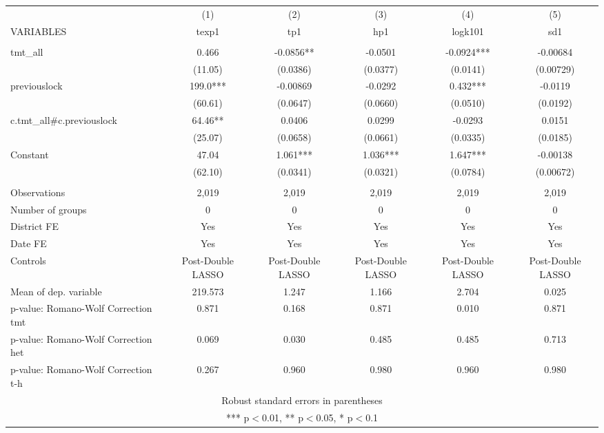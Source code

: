 \documentclass[]{article}
\begin{document}
\begin{tabular}{lccccc} \hline
 & (1) & (2) & (3) & (4) & (5) \\
VARIABLES & texp1 & tp1 & hp1 & logk101 & sd1 \\ \hline
 &  &  &  &  &  \\
tmt\_all & 0.466 & -0.0856** & -0.0501 & -0.0924*** & -0.00684 \\
 & (11.05) & (0.0386) & (0.0377) & (0.0141) & (0.00729) \\
previouslock & 199.0*** & -0.00869 & -0.0292 & 0.432*** & -0.0119 \\
 & (60.61) & (0.0647) & (0.0660) & (0.0510) & (0.0192) \\
c.tmt\_all\#c.previouslock & 64.46** & 0.0406 & 0.0299 & -0.0293 & 0.0151 \\
 & (25.07) & (0.0658) & (0.0661) & (0.0335) & (0.0185) \\
Constant & 47.04 & 1.061*** & 1.036*** & 1.647*** & -0.00138 \\
 & (62.10) & (0.0341) & (0.0321) & (0.0784) & (0.00672) \\
 &  &  &  &  &  \\
Observations & 2,019 & 2,019 & 2,019 & 2,019 & 2,019 \\
Number of groups & 0 & 0 & 0 & 0 & 0 \\
District FE & Yes & Yes & Yes & Yes & Yes \\
Date FE & Yes & Yes & Yes & Yes & Yes \\
Controls & Post-Double LASSO & Post-Double LASSO & Post-Double LASSO & Post-Double LASSO & Post-Double LASSO \\
Mean of dep. variable & 219.573 & 1.247 & 1.166 & 2.704 & 0.025 \\
p-value: Romano-Wolf Correction tmt & 0.871 & 0.168 & 0.871 & 0.010 & 0.871 \\
p-value: Romano-Wolf Correction het & 0.069 & 0.030 & 0.485 & 0.485 & 0.713 \\
 p-value: Romano-Wolf Correction t-h & 0.267 & 0.960 & 0.980 & 0.960 & 0.980 \\ \hline
\multicolumn{6}{c}{ Robust standard errors in parentheses} \\
\multicolumn{6}{c}{ *** p$<$0.01, ** p$<$0.05, * p$<$0.1} \\
\end{tabular}
\end{document}
